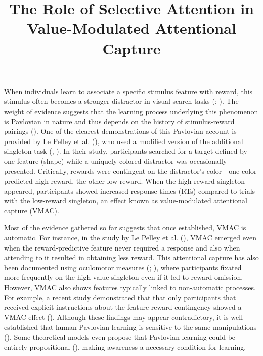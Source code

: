 \documentclass[
  man,
  floatsintext,
  longtable,
  nolmodern,
  notxfonts,
  notimes,
  colorlinks=true,linkcolor=blue,citecolor=blue,urlcolor=blue]{apa7}
\title{The Role of Selective Attention in Value-Modulated Attentional
Capture}
\begin{document}
\maketitle


\setcounter{secnumdepth}{-\maxdimen} %

\setlength\LTleft{0pt}


When individuals learn to associate a specific stimulus feature with
reward, this stimulus often becomes a stronger distractor in visual
search tasks (;
). The weight of
evidence suggests that the learning process underlying this phenomenon
is Pavlovian in nature and thus depends on the history of
stimulus-reward pairings (). One of the clearest demonstrations of this Pavlovian account is
provided by Le Pelley et al. (), who
used a modified version of the additional singleton task
(,
). In their study, participants
searched for a target defined by one feature (shape) while a uniquely
colored distractor was occasionally presented. Critically, rewards were
contingent on the distractor's color---one color predicted high reward,
the other low reward. When the high-reward singleton appeared,
participants showed increased response times (RTs) compared to trials
with the low-reward singleton, an effect known as value-modulated
attentional capture (VMAC).

Most of the evidence gathered so far suggests that once established,
VMAC is automatic. For instance, in the study by Le Pelley et al.
(), VMAC emerged even when the
reward-predictive feature never required a response and also when
attending to it resulted in obtaining less reward. This attentional
capture has also been documented using oculomotor measures
(;
), where
participants fixated more frequently on the high-value singleton even if
it led to reward omission. However, VMAC also shows features typically
linked to non-automatic processes. For example, a recent study
demonstrated that that only participants that received explicit
instructions about the feature-reward contingency showed a VMAC effect
(). Although these findings may appear contradictory, it is
well-established that human Pavlovian learning is sensitive to the same
manipulations ().
Some theoretical models even propose that Pavlovian learning could be
entirely propositional (), making awareness a necessary condition for learning.
\end{document}
